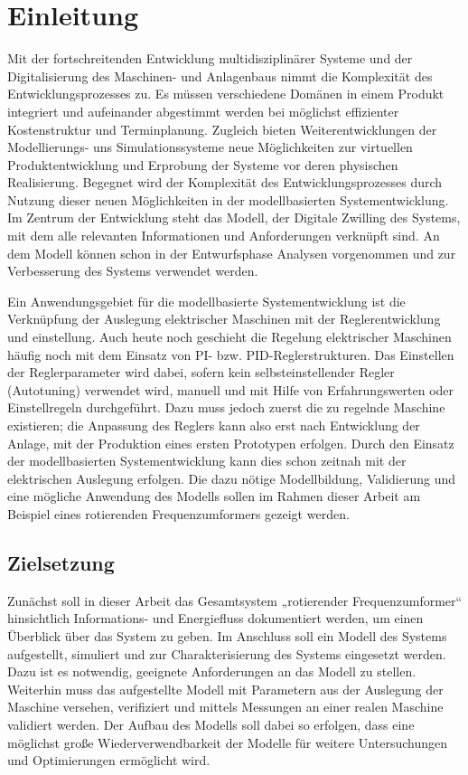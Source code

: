 \chapter{Einleitung}
\label{chap:Einleitung}
Mit der fortschreitenden Entwicklung multidisziplinärer Systeme und der Digitalisierung des Maschinen- und Anlagenbaus nimmt die Komplexität des Entwicklungsprozesses zu. Es müssen verschiedene Domänen in einem Produkt integriert und aufeinander abgestimmt werden bei möglichst effizienter Kostenstruktur und Terminplanung. Zugleich bieten Weiterentwicklungen der Modellierungs- uns Simulationssysteme neue Möglichkeiten zur virtuellen Produktentwicklung und Erprobung der Systeme vor deren physischen Realisierung. Begegnet wird der Komplexität des Entwicklungsprozesses durch Nutzung dieser neuen Möglichkeiten in der modellbasierten Systementwicklung. Im Zentrum der Entwicklung steht das Modell, der Digitale Zwilling des Systems, mit dem alle relevanten Informationen und Anforderungen verknüpft sind. An dem Modell können schon in der Entwurfsphase Analysen vorgenommen und zur Verbesserung des Systems verwendet werden. 

Ein Anwendungsgebiet für die modellbasierte Systementwicklung ist die Verknüpfung der Auslegung elektrischer Maschinen mit der Reglerentwicklung und einstellung. Auch heute noch geschieht die Regelung elektrischer Maschinen häufig noch mit dem Einsatz von PI- bzw. PID-Reglerstrukturen. Das Einstellen der Reglerparameter wird dabei, sofern kein selbsteinstellender Regler
(Autotuning) verwendet wird, manuell und mit Hilfe von Erfahrungswerten oder Einstellregeln durchgeführt. Dazu muss jedoch zuerst die zu regelnde Maschine existieren; die Anpassung des Reglers kann also erst nach Entwicklung der Anlage, mit der Produktion eines ersten Prototypen erfolgen. Durch den Einsatz der modellbasierten Systementwicklung kann dies schon zeitnah mit der elektrischen Auslegung erfolgen. Die dazu nötige Modellbildung, Validierung und eine mögliche Anwendung des Modells sollen im Rahmen dieser Arbeit am Beispiel eines rotierenden Frequenzumformers gezeigt werden.

\section{Zielsetzung}
\label{sec:Zielsetzung}
Zunächst soll in dieser Arbeit das Gesamtsystem „rotierender Frequenzumformer“ hinsichtlich Informations- und Energiefluss dokumentiert werden, um einen Überblick über das System zu geben. Im Anschluss soll ein Modell des Systems aufgestellt, simuliert und zur Charakterisierung des Systems eingesetzt werden. Dazu ist es notwendig, geeignete Anforderungen an das Modell zu stellen. Weiterhin muss das aufgestellte Modell mit Parametern aus der Auslegung der Maschine versehen, verifiziert und mittels Messungen an einer realen Maschine validiert werden. Der Aufbau des Modells soll dabei so erfolgen, dass eine möglichst große Wiederverwendbarkeit der Modelle für weitere Untersuchungen und Optimierungen ermöglicht wird.

